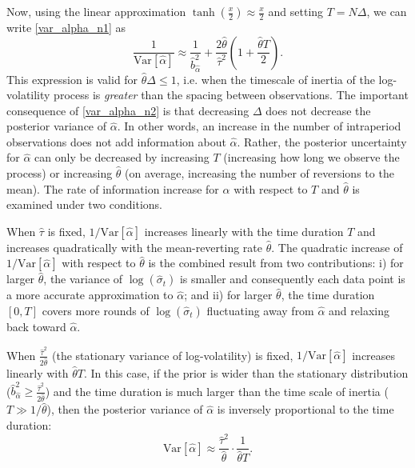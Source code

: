 \documentclass[10pt]{article}
\newcommand{\htheta}{\hat{\theta}}
\newcommand{\halpha}{\hat{\alpha}}
\newcommand{\Var}[1]{\mbox{Var}\left[#1\right]}
\begin{document}
Now, using the linear approximation $\tanh\left(\frac{x}{2} \right) \approx \frac{x}{2}$ and setting $T=N \Delta $, we can write \eqref{var_alpha_n1} as
\begin{equation}
\frac{1}{\Var{\hat{\alpha}} } \approx \frac{1}{\hat{b}^2_{\hat{\alpha}} } + \frac{2\hat{\theta} }{\hat{\tau}^2}  \left(1 + \frac{\hat{\theta} T}{2} \right).  \label{var_alpha_n2}
\end{equation}
This expression is valid for $\hat{\theta} \Delta \le 1$, i.e. when the timescale of inertia of the log-volatility process is \textit{greater} than the spacing between observations. The important consequence of \eqref{var_alpha_n2} is that decreasing $\Delta$ does not decrease the posterior variance of $\halpha$. In other words, an increase in the number of intraperiod observations does not add information about $\halpha$. Rather, the posterior uncertainty for $\halpha$ can only be decreased by increasing $T$ (increasing how long we observe the process) or increasing $\htheta$ (on average, increasing the number of reversions to the mean). The rate of information increase for $\halpha$ with respect to $T$ and $\htheta$ is examined under two conditions.

When $\hat{\tau}$ is fixed, $1/\Var{\hat{\alpha}} $ increases linearly with the time duration $T$ and increases quadratically with the mean-reverting rate $\hat{\theta} $.  The quadratic increase of $1/\Var{\hat{\alpha}} $ with respect to $\hat{\theta} $ is the combined result from two contributions: i) for larger $\hat{\theta} $, the variance of $\log(\hat{\sigma}_t) $ is smaller and consequently each data point is a more accurate approximation to $\hat{\alpha }$; and ii) for larger $\hat{\theta} $, the time duration $[0, T]$ covers more rounds of $\log(\hat{\sigma}_t) $ fluctuating away from $\hat{\alpha }$ and relaxing back toward $\hat{\alpha }$.

When $\frac{\hat{\tau}^2}{2\hat{\theta} } $ (the stationary variance of log-volatility) is fixed, $1/\Var{\hat{\alpha}} $ increases linearly with $\hat{\theta} T$. In this case, if the prior is wider than the stationary distribution ($\hat{b}^2_{\hat{\alpha}} \ge \frac{\hat{\tau}^2}{2\hat{\theta} } $) and the time duration is much larger than the time scale of inertia ($T \gg 1/\hat{\theta}$), then the posterior variance of $\hat{\alpha} $ is inversely proportional to the time duration:
\begin{equation}
\Var{\hat{\alpha}} \approx \frac{\hat{\tau}^2}{\hat{\theta} } \cdot \frac{1}{\hat{\theta} T}. \label{var_alpha_n3}
\end{equation}
\end{document}
